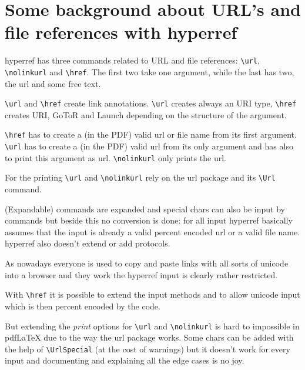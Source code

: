 \documentclass{article}
\newcommand\cs[1]{\texttt{\textbackslash #1}}
\begin{document}
%
%
%

%
\section{Some background about URL's and file references with hyperref}

hyperref has three commands related to URL and file references: \cs{url},
\cs{nolinkurl} and \cs{href}. The first two take one argument,
while the last has two, the url and some free text.


\cs{url} and \cs{href} create link annotations. \cs{url} creates always an URI
type, \cs{href} creates URI, GoToR and Launch depending on the structure of the argument.

\cs{href} has to create a (in the PDF) valid url or file name from its first argument.
\cs{url} has to create a (in the PDF) valid url from its only argument and has also to print
this argument as url. \cs{nolinkurl} only prints the url.

For the printing \cs{url} and \cs{nolinkurl} rely on the url package and its \cs{Url} command.

(Expandable) commands are expanded and special chars can also be input by commands but
beside this no conversion is done: for all input hyperref basically assumes that
the input is already a valid percent encoded url or a valid file name. hyperref also
doesn't extend or add protocols.

As nowadays everyone is used to copy and paste links with all sorts of unicode into a browser and
they work the hyperref input is clearly rather restricted.


With \cs{href} it is possible to extend the input methods and to allow unicode input which is then
percent encoded by the code.

But extending the \emph{print} options for \cs{url} and \cs{nolinkurl}
is hard to impossible in pdf\LaTeX{} due to the way the url package works.
Some chars can be added with the help of \cs{UrlSpecial} (at the cost of warnings)
but it doesn't work for every input and documenting and explaining all the edge cases is no joy.
\end{document}
